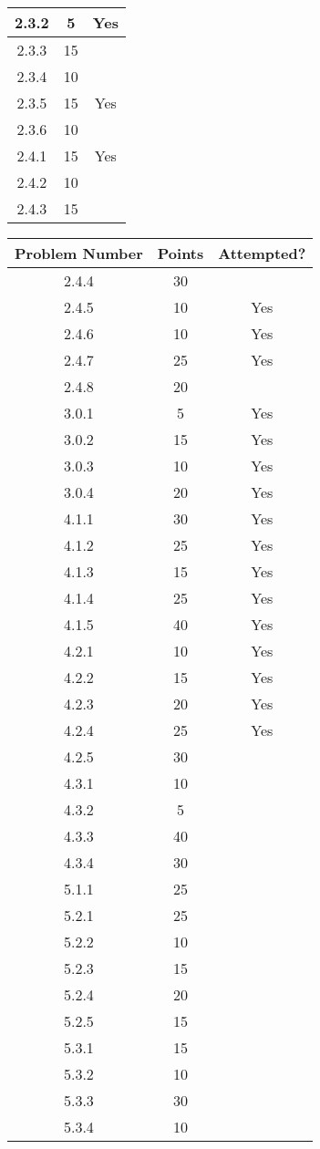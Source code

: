 \documentclass[12pt]{article}
\begin{document}
\begin{center}
\begin{tabular}{|c|c|c|}
2.3.2 & 5 & Yes\\\hline
2.3.3 & 15 & \\\hline
2.3.4 & 10 & \\\hline
2.3.5 & 15 & Yes\\\hline
2.3.6 & 10 & \\\hline
2.4.1 & 15 & Yes\\\hline
2.4.2 & 10 & \\\hline
2.4.3 & 15 & \\\hline
\end{tabular}
\hspace{0.5 cm}
\begin{tabular}{|c|c|c|}\hline
Problem Number & Points & Attempted?\\\hline
2.4.4 & 30 & \\\hline
2.4.5 & 10 & Yes\\\hline
2.4.6 & 10 & Yes\\\hline
2.4.7 & 25 & Yes\\\hline
2.4.8 & 20 & \\\hline
3.0.1 & 5 & Yes \\\hline
3.0.2 & 15 & Yes \\\hline
3.0.3 & 10 & Yes \\\hline
3.0.4 & 20 & Yes \\\hline
4.1.1 & 30 & Yes \\\hline
4.1.2 & 25 & Yes \\\hline
4.1.3 & 15 & Yes \\\hline
4.1.4 & 25 & Yes \\\hline
4.1.5 & 40 & Yes \\\hline
4.2.1 & 10 & Yes \\\hline
4.2.2 & 15 & Yes \\\hline
4.2.3 & 20 & Yes \\\hline
4.2.4 & 25 & Yes \\\hline
4.2.5 & 30 & \\\hline
4.3.1 & 10 & \\\hline
4.3.2 & 5 & \\\hline
4.3.3 & 40 & \\\hline
4.3.4 & 30 & \\\hline
5.1.1 & 25 & \\\hline
5.2.1 & 25 & \\\hline
5.2.2 & 10 & \\\hline
5.2.3 & 15 & \\\hline
5.2.4 & 20 & \\\hline
5.2.5 & 15 & \\\hline
5.3.1 & 15 & \\\hline
5.3.2 & 10 & \\\hline
5.3.3 & 30 & \\\hline
5.3.4 & 10 & \\\hline
\end{tabular}
\end{center}
\newpage 
\small
\tableofcontents
\normalsize
\newpage
\end{document}
